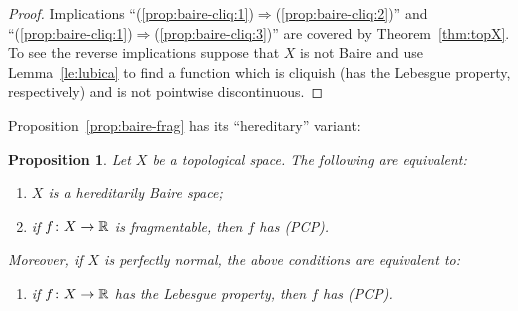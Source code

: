 \documentclass[a4paper]{amsart}
\theoremstyle{plain}
\newtheorem{proposition}[theorem]{Proposition}
\theoremstyle{definition}
\theoremstyle{remark}
\numberwithin{equation}{section}
\begin{document}
  \begin{proof}
      Implications ``(\ref{prop:baire-cliq:1})$\Rightarrow$(\ref{prop:baire-cliq:2})''
      and ``(\ref{prop:baire-cliq:1})$\Rightarrow$(\ref{prop:baire-cliq:3})''
      are covered by Theorem~\ref{thm:topX}. To see the reverse implications 
      suppose that $X$ is not Baire and use Lemma~\ref{le:lubica}
      to find a function which is cliquish (has the Lebesgue property, respectively)
      and is not pointwise discontinuous.
  \end{proof}

Proposition~\ref{prop:baire-frag} has its ``hereditary'' variant:
  
 \begin{proposition}\label{prop:hbaire-frag} 
 	Let $X$ be a topological space. The following are equivalent:
 	\begin{enumerate}
 		\item $X$ is a hereditarily  Baire space;\label{prop:hbaire-frag:1}
 		\item if $f\colon X \to \Bbb R$ is fragmentable,  then $f$ has (PCP).\label{prop:hbaire-frag:2}
 	\end{enumerate}
    Moreover, if $X$ is perfectly normal, the above conditions are equivalent to:
 	\begin{enumerate}[start=3]
 		\item if $f\colon X \to \Bbb R$ has the Lebesgue property,  then $f$ has (PCP).\label{prop:hbaire-frag:3}
 	\end{enumerate}
 \end{proposition}
\end{document}
